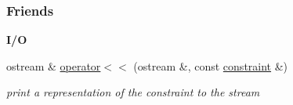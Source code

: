 \subsubsection*{Friends}
\begin{Indent}\textbf{ I/O}\par
\begin{DoxyCompactItemize}
\item 
ostream \& \hyperlink{group___c_l_s_solvers_a829b1dbba361c34d021ebe82ccf5cb7f}{operator$<$$<$} (ostream \&, const \hyperlink{group___c_l_s_solvers_classconstraint}{constraint} \&)
\begin{DoxyCompactList}\small\item\em print a representation of the constraint to the stream \end{DoxyCompactList}\end{DoxyCompactItemize}
\end{Indent}
